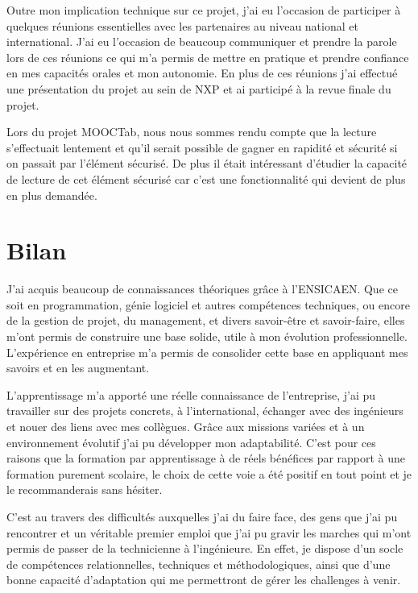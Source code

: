 \documentclass[french,12pt,a4paper,titlepage,openright,openbib]{report}
\begin{document}
Outre mon implication technique sur ce projet, j'ai eu l'occasion de participer à quelques réunions essentielles avec les partenaires au niveau national et international. J'ai eu l'occasion de beaucoup communiquer et prendre la parole lors de ces réunions ce qui m'a permis de mettre en pratique et prendre confiance en mes capacités orales et mon autonomie.
En plus de ces réunions j'ai effectué une présentation du projet au sein de NXP et ai participé à la revue finale du projet.

Lors du projet MOOCTab, nous nous sommes rendu compte que la lecture s'effectuait lentement et qu'il serait possible de gagner en rapidité et sécurité si on passait par l'élément sécurisé. De plus il était intéressant d'étudier la capacité de lecture de cet élément sécurisé car c'est une fonctionnalité qui devient de plus en plus demandée.


\chapter{Bilan}
J'ai acquis beaucoup de connaissances théoriques grâce à l'ENSICAEN. Que ce soit en programmation, génie logiciel et autres compétences techniques, ou encore de la gestion de projet, du management, et divers savoir-être et savoir-faire, elles m'ont permis de construire une base solide, utile à mon évolution professionnelle.
L'expérience en entreprise m'a permis de consolider cette base en appliquant mes savoirs et en les augmentant.

L'apprentissage m'a apporté une réelle connaissance de l'entreprise, j'ai pu travailler sur des projets concrets, à l'international, échanger avec des ingénieurs et nouer des liens avec mes collègues. Grâce aux missions variées et à un environnement évolutif j'ai pu développer mon adaptabilité.
C'est pour ces raisons que la formation par apprentissage à de réels bénéfices par rapport à une formation purement scolaire, le choix de cette voie a été positif en   tout point et je le recommanderais sans hésiter.

C'est au travers des difficultés auxquelles j'ai du faire face, des gens que j'ai pu rencontrer et un véritable premier emploi que j'ai pu gravir les marches qui m'ont permis de passer de la technicienne à l'ingénieure. En effet, je dispose d'un socle de compétences relationnelles, techniques et méthodologiques, ainsi que d'une bonne capacité d'adaptation qui me permettront de gérer les challenges à venir.
\end{document}

